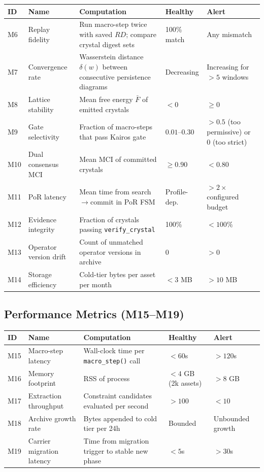 \documentclass[10pt,a4paper]{article}
\begin{document}
\begin{longtable}{l l p{4.8cm} l l}
\toprule \textbf{ID} & \textbf{Name} & \textbf{Computation} & \textbf{Healthy} & \textbf{Alert} \\
\midrule\endhead
M6 & Replay fidelity & Run macro-step twice with saved $RD$; compare crystal digest sets & 100\% match & Any mismatch \\
M7 & Convergence rate & Wasserstein distance $\delta(w)$ between consecutive persistence diagrams & Decreasing & Increasing for $>5$ windows \\
M8 & Lattice stability & Mean free energy $\bar{F}$ of emitted crystals & $<0$ & $\geq 0$ \\
M9 & Gate selectivity & Fraction of macro-steps that pass Kairos gate & $0.01$--$0.30$ & $>0.5$ (too permissive) or $0$ (too strict) \\
M10 & Dual consensus MCI & Mean MCI of committed crystals & $\geq 0.90$ & $<0.80$ \\
M11 & PoR latency & Mean time from search$\to$commit in PoR FSM & Profile-dep. & $>2\times$ configured budget \\
M12 & Evidence integrity & Fraction of crystals passing \texttt{verify\_crystal} & 100\% & $<100\%$ \\
M13 & Operator version drift & Count of unmatched operator versions in archive & 0 & $>0$ \\
M14 & Storage efficiency & Cold-tier bytes per asset per month & $<3$ MB & $>10$ MB \\
\bottomrule
\end{longtable}

\subsection{Performance Metrics (M15--M19)}

\begin{longtable}{l l p{4.8cm} l l}
\toprule \textbf{ID} & \textbf{Name} & \textbf{Computation} & \textbf{Healthy} & \textbf{Alert} \\
\midrule\endhead
M15 & Macro-step latency & Wall-clock time per \texttt{macro\_step()} call & $<60$s & $>120$s \\
M16 & Memory footprint & RSS of process & $<4$ GB (2k assets) & $>8$ GB \\
M17 & Extraction throughput & Constraint candidates evaluated per second & $>100$ & $<10$ \\
M18 & Archive growth rate & Bytes appended to cold tier per 24h & Bounded & Unbounded growth \\
M19 & Carrier migration latency & Time from migration trigger to stable new phase & $<5$s & $>30$s \\
\bottomrule
\end{longtable}
\end{document}
